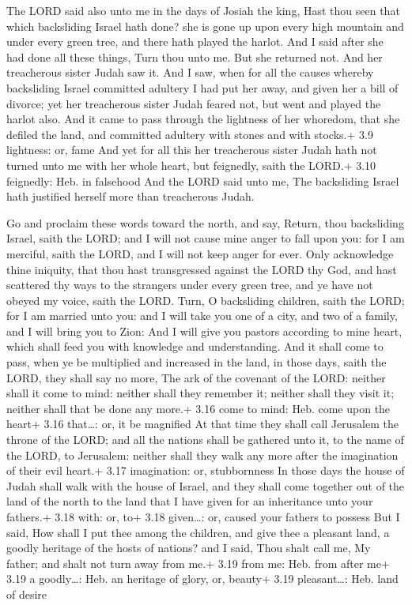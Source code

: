  The LORD said also unto me in the days of Josiah the
king, Hast thou seen that which backsliding Israel hath done? she is
gone up upon every high mountain and under every green tree, and there
hath played the harlot.  And I said after she had done all
these things, Turn thou unto me. But she returned not. And her
treacherous sister Judah saw it.  And I saw, when for all
the causes whereby backsliding Israel committed adultery I had put her
away, and given her a bill of divorce; yet her treacherous sister Judah
feared not, but went and played the harlot also.  And it
came to pass through the lightness of her whoredom, that she defiled the
land, and committed adultery with stones and with stocks.+ 3.9
lightness: or, fame  And yet for all this her treacherous
sister Judah hath not turned unto me with her whole heart, but
feignedly, saith the LORD.+ 3.10 feignedly: Heb. in falsehood
 And the LORD said unto me, The backsliding Israel hath
justified herself more than treacherous Judah.

 Go and proclaim these words toward the north, and say,
Return, thou backsliding Israel, saith the LORD; and I will not cause
mine anger to fall upon you: for I am merciful, saith the LORD, and I
will not keep anger for ever.  Only acknowledge thine
iniquity, that thou hast transgressed against the LORD thy God, and hast
scattered thy ways to the strangers under every green tree, and ye have
not obeyed my voice, saith the LORD.  Turn, O backsliding
children, saith the LORD; for I am married unto you: and I will take you
one of a city, and two of a family, and I will bring you to Zion:
 And I will give you pastors according to mine heart, which
shall feed you with knowledge and understanding.  And it
shall come to pass, when ye be multiplied and increased in the land, in
those days, saith the LORD, they shall say no more, The ark of the
covenant of the LORD: neither shall it come to mind: neither shall they
remember it; neither shall they visit it; neither shall that be done any
more.+ 3.16 come to mind: Heb. come upon the heart+ 3.16 that\ldots: or,
it be magnified  At that time they shall call Jerusalem the
throne of the LORD; and all the nations shall be gathered unto it, to
the name of the LORD, to Jerusalem: neither shall they walk any more
after the imagination of their evil heart.+ 3.17 imagination: or,
stubbornness  In those days the house of Judah shall walk
with the house of Israel, and they shall come together out of the land
of the north to the land that I have given for an inheritance unto your
fathers.+ 3.18 with: or, to+ 3.18 given\ldots: or, caused your fathers
to possess  But I said, How shall I put thee among the
children, and give thee a pleasant land, a goodly heritage of the hosts
of nations? and I said, Thou shalt call me, My father; and shalt not
turn away from me.+ 3.19 from me: Heb. from after me+ 3.19 a
goodly\ldots: Heb. an heritage of glory, or, beauty+ 3.19
pleasant\ldots: Heb. land of desire

